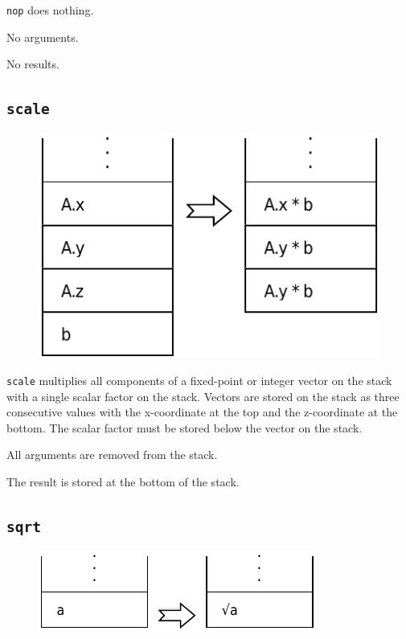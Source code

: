 			\texttt{nop} does nothing.
			
			No arguments.
			
			No results.
	
	\qquad
	
	\subsection*{\texttt{scale}}
	
		\begin{figure}
			\begin{flushright}
				\includegraphics[width=\linewidth]{figure/pdf/i_scale} 
			\end{flushright}
		\end{figure}
	
			\texttt{scale} multiplies all components of a fixed-point or
			integer vector on the stack with a single scalar factor on the
			stack. Vectors are stored on the stack as three consecutive values
			with the x-coordinate at the top and the z-coordinate at the
			bottom. The scalar factor must be stored below the vector on the
			stack.
			
			All arguments are removed from the stack.
			
			The result is stored at the bottom of the stack.
	
	\qquad
	
	\subsection*{\texttt{sqrt}}
	
		\begin{figure}
			\begin{flushright}
				\includegraphics[width=\linewidth]{figure/pdf/i_sqrt} 
			\end{flushright}
		\end{figure}
	
